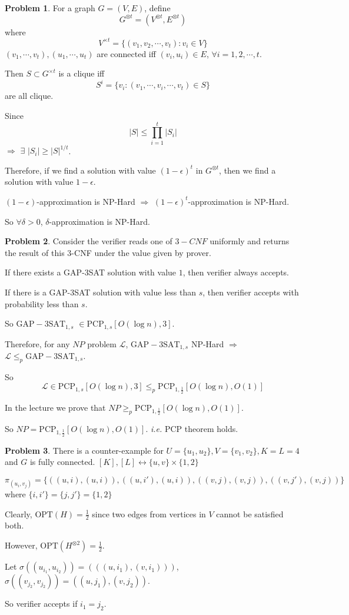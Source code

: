 \documentclass[a4paper]{article}
\theoremstyle{definition}
\newtheorem{problem}{Problem}
\theoremstyle{plain}
\newcommand{\OPT}{\mathrm{OPT}}
\numberwithin{equation}{problem}
\newcommand{\ie}{ \textit{ i.e. } }
\begin{document}
\begin{problem}
  For a graph  $ G=(V,E) $, define 
  \[G^{\otimes t}=(V^{\otimes t},E^{\otimes t})\]
  where 
  \[V^{\times t}=\{(v_1,v_2,\cdots,v_t):v_i\in V\}\]
  $ (v_1,\cdots,v_t),(u_1,\cdots,u_t) $ are connected iff  $ (v_i,u_i)\in E $, $ \forall i=1,2,\cdots,t $.  
  
  Then  $ S\subset G^{\times t} $ is a clique iff 
  \[S^i=\{v_i:(v_1,\cdots,v_i,\cdots,v_t)\in S\}\]
  are all  clique.
  
  Since 
  \[|S| \leq \prod_{i=1}^t|S_i|\]
  $ \Rightarrow $  $ \exists $  $ |S_i| \geq |S|^{1/t} $.
  
  Therefore, if we find a solution with value  $ (1-\epsilon)^t $ in  $ G^{\otimes t} $, then we find a solution with value   $ 1-\epsilon $.
  
  $ (1-\epsilon) $-approximation is NP-Hard  $ \Rightarrow  $  $ (1-\epsilon)^t$-approximation is NP-Hard.
  
  So  $ \forall \delta>0 $,  $ \delta $-approximation is NP-Hard.  

  

\end{problem}

\begin{problem}
  Consider the verifier reads one of  $ 3-CNF $ uniformly and returns the result of this 3-CNF under the value given by prover. 

  If there exists a GAP-3SAT  solution with value  $ 1 $, then  verifier always accepts.

  If there is  a GAP-3SAT solution with value less than  $ s $, then  verifier accepts with probability less than  $ s $.
  
  So  $ \mathrm{GAP-3SAT}_{1,s} $  $ \in \mathrm{PCP}_{1,s}[O(\log n),3] $.
  
  Therefore, for any  $ NP $ problem  $ \mathcal{L} $,  $ \mathrm{GAP-3SAT}_{1,s} $ NP-Hard  $ \Rightarrow  $  $ \mathcal{L} \leq _p \mathrm{GAP-3SAT}_{1,s} $.
  
  So 
  \[\mathcal{L}\in \mathrm{PCP}_{1,s}[O(\log n),3] \leq _p\mathrm{PCP}_{1,\frac{1}{2}}[O(\log n),O(1)]\]

  In the lecture we prove that  $ NP \geq _p\mathrm{PCP}_{1,\frac{1}{2}}[O(\log n),O(1)]  $.

  So  $ NP=\mathrm{PCP}_{1,\frac{1}{2}}[O(\log n),O(1)] $. \ie PCP theorem holds. 
\end{problem} 

\begin{problem}
  There is a counter-example for  $ U=\{u_1,u_2\},V=\{v_1,v_2\},K=L=4 $ and  $ G $ is fully connected. 
$ [K],[L]\leftrightarrow \{u,v\}\times\{1,2\} $ 

$ \pi_{(u_i,v_j)}=\{((u,i),(u,i)),((u,i'),(u,i)),((v,j),(v,j)),((v,j'),(v,j))\} $ where  $ \{i,i'\}=\{j,j'\}=\{1,2\} $  

Clearly,  $ \OPT(H)=\frac{1}{2} $ since two edges from vertices in  $ V $ cannot be satisfied both.

However,  $ \OPT(H^{\otimes 2})=\frac{1}{2} $.

Let  $ \sigma((u_{i_1},u_{i_2}))=(((u,i_1),(v,i_1))) $,  $ \sigma((v_{j_2},v_{j_2}))=((u,j_1),(v,j_2)) $.  

So verifier accepts if  $ i_1=j_2 $.
\end{problem}
\end{document}
